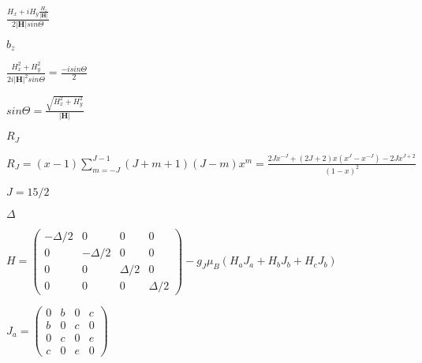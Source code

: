 \documentclass[twoside]{article}
\def\lthtmlcheckvsize{\ifdim\ht\sizebox<\vsize 
  \ifdim\wd\sizebox<\hsize\expandafter\hfill\fi \expandafter\vfill
  \else\expandafter\vss\fi}%
\begin{document}
{\newpage\clearpage
{}%
$\displaystyle \frac{H_x+i H_y \frac{H_z}{|\mathbf H|}}{2|\mathbf H| sin\Theta}$%
\lthtmlindisplaymathZ
\lthtmlcheckvsize\clearpage}

{\newpage\clearpage
{}%
$\displaystyle b_z$%
\lthtmlindisplaymathZ
\lthtmlcheckvsize\clearpage}

{\newpage\clearpage
{}%
$\displaystyle \frac{H_x^2+H_y^2}{2i|\mathbf H|^2 sin\Theta}=\frac{-isin\Theta}{2}$%
\lthtmlindisplaymathZ
\lthtmlcheckvsize\clearpage}

{\newpage\clearpage
{}%
$\displaystyle sin\Theta=\frac{\sqrt{H_x^2+H_y^2}}{|\mathbf H|}$%
\lthtmlindisplaymathZ
\lthtmlcheckvsize\clearpage}

{\newpage\clearpage
{}%
$R_J$%
\lthtmlindisplaymathZ
\lthtmlcheckvsize\clearpage}

{\newpage\clearpage
{}%
$\displaystyle R_J=(x-1)\sum_{m=-J}^{J-1}(J+m+1)(J-m)x^m=\frac{2Jx^{-J}+(2J+2)x(x^{J}-x^{-J})-2Jx^{J+2}}{(1-x)^2}
$%
\lthtmlindisplaymathZ
\lthtmlcheckvsize\clearpage}

{\newpage\clearpage
{}%
$J=15/2$%
\lthtmlindisplaymathZ
\lthtmlcheckvsize\clearpage}

{\newpage\clearpage
{}%
$\Delta$%
\lthtmlindisplaymathZ
\lthtmlcheckvsize\clearpage}

{\newpage\clearpage
{}%
$\displaystyle
H=\left (
\begin{array}{cccc}
-\Delta/2 & 0 & 0 & 0 \\
0 & -\Delta/2 & 0 & 0 \\
0 & 0 & \Delta/2  & 0 \\
0 & 0 & 0 & \Delta/2 
\end{array}
\right)
 -g_J \mu_B (H_a J_a + H_b J_b + H_c J_b)
$%
\lthtmlindisplaymathZ
\lthtmlcheckvsize\clearpage}

{\newpage\clearpage
{}%
$\displaystyle J_a=
\left (
\begin{array}{cccc}
0 & b & 0 & c \\
b & 0 & c & 0 \\
0 & c & 0 & e \\
c & 0 & e & 0 
\end{array}
\right )
$%
\lthtmlindisplaymathZ
\lthtmlcheckvsize\clearpage}
\end{document}
